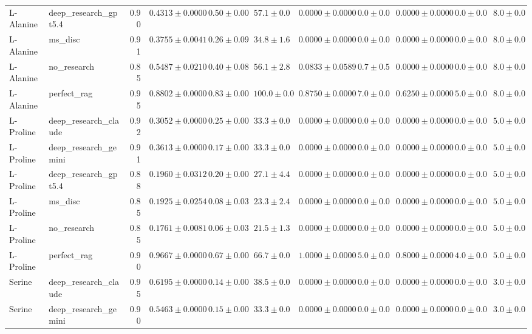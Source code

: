 \begin{table}[htbp]
\begin{tabular}{llrrrrrrrrr}
L-Alanine & deep_research_gpt5.4 & 0.90 & $0.4313 \pm 0.0000$ & $0.50 \pm 0.00$ & $57.1 \pm 0.0$ & $0.0000 \pm 0.0000$ & $0.0 \pm 0.0$ & $0.0000 \pm 0.0000$ & $0.0 \pm 0.0$ & $8.0 \pm 0.0$ \\
L-Alanine & ms_disc & 0.91 & \cellcolor{red!25}$0.3755 \pm 0.0041$ & $0.26 \pm 0.09$ & $34.8 \pm 1.6$ & $0.0000 \pm 0.0000$ & $0.0 \pm 0.0$ & $0.0000 \pm 0.0000$ & $0.0 \pm 0.0$ & $8.0 \pm 0.0$ \\
L-Alanine & no_research & 0.85 & $0.5487 \pm 0.0210$ & $0.40 \pm 0.08$ & $56.1 \pm 2.8$ & $0.0833 \pm 0.0589$ & $0.7 \pm 0.5$ & $0.0000 \pm 0.0000$ & $0.0 \pm 0.0$ & $8.0 \pm 0.0$ \\
L-Alanine & perfect_rag & 0.95 & \cellcolor{green!25}$0.8802 \pm 0.0000$ & $0.83 \pm 0.00$ & $100.0 \pm 0.0$ & $0.8750 \pm 0.0000$ & $7.0 \pm 0.0$ & $0.6250 \pm 0.0000$ & $5.0 \pm 0.0$ & $8.0 \pm 0.0$ \\
\midrule
L-Proline & deep_research_claude & 0.92 & $0.3052 \pm 0.0000$ & $0.25 \pm 0.00$ & $33.3 \pm 0.0$ & $0.0000 \pm 0.0000$ & $0.0 \pm 0.0$ & $0.0000 \pm 0.0000$ & $0.0 \pm 0.0$ & $5.0 \pm 0.0$ \\
L-Proline & deep_research_gemini & 0.91 & $0.3613 \pm 0.0000$ & $0.17 \pm 0.00$ & $33.3 \pm 0.0$ & $0.0000 \pm 0.0000$ & $0.0 \pm 0.0$ & $0.0000 \pm 0.0000$ & $0.0 \pm 0.0$ & $5.0 \pm 0.0$ \\
L-Proline & deep_research_gpt5.4 & 0.88 & $0.1960 \pm 0.0312$ & $0.20 \pm 0.00$ & $27.1 \pm 4.4$ & $0.0000 \pm 0.0000$ & $0.0 \pm 0.0$ & $0.0000 \pm 0.0000$ & $0.0 \pm 0.0$ & $5.0 \pm 0.0$ \\
L-Proline & ms_disc & 0.85 & $0.1925 \pm 0.0254$ & $0.08 \pm 0.03$ & $23.3 \pm 2.4$ & $0.0000 \pm 0.0000$ & $0.0 \pm 0.0$ & $0.0000 \pm 0.0000$ & $0.0 \pm 0.0$ & $5.0 \pm 0.0$ \\
L-Proline & no_research & 0.85 & \cellcolor{red!25}$0.1761 \pm 0.0081$ & $0.06 \pm 0.03$ & $21.5 \pm 1.3$ & $0.0000 \pm 0.0000$ & $0.0 \pm 0.0$ & $0.0000 \pm 0.0000$ & $0.0 \pm 0.0$ & $5.0 \pm 0.0$ \\
L-Proline & perfect_rag & 0.90 & \cellcolor{green!25}$0.9667 \pm 0.0000$ & $0.67 \pm 0.00$ & $66.7 \pm 0.0$ & $1.0000 \pm 0.0000$ & $5.0 \pm 0.0$ & $0.8000 \pm 0.0000$ & $4.0 \pm 0.0$ & $5.0 \pm 0.0$ \\
\midrule
Serine & deep_research_claude & 0.95 & $0.6195 \pm 0.0000$ & $0.14 \pm 0.00$ & $38.5 \pm 0.0$ & $0.0000 \pm 0.0000$ & $0.0 \pm 0.0$ & $0.0000 \pm 0.0000$ & $0.0 \pm 0.0$ & $3.0 \pm 0.0$ \\
Serine & deep_research_gemini & 0.90 & $0.5463 \pm 0.0000$ & $0.15 \pm 0.00$ & $33.3 \pm 0.0$ & $0.0000 \pm 0.0000$ & $0.0 \pm 0.0$ & $0.0000 \pm 0.0000$ & $0.0 \pm 0.0$ & $3.0 \pm 0.0$ \\

\end{tabular}
\end{table}
